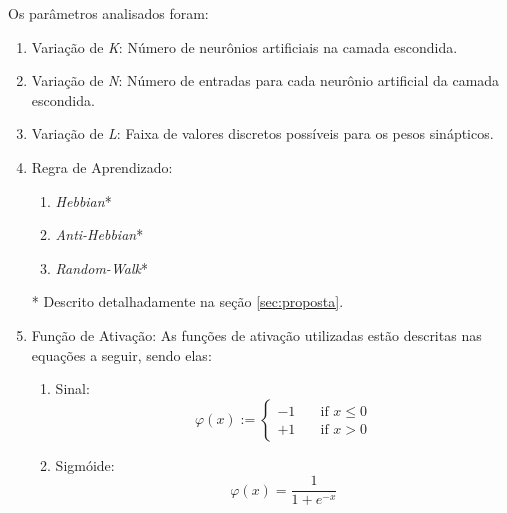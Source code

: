 \documentclass[a4paper,10pt,oneside,conference,final,keeplastbox]{inatel}
\begin{document}
            Os parâmetros analisados foram:
            \begin{enumerate}
                \item Variação de \textit{K}: Número de neurônios artificiais na camada escondida.
            
                \item Variação de \textit{N}: Número de entradas para cada neurônio artificial da camada escondida.
                
                \item Variação de \textit{L}: Faixa de valores discretos possíveis para os pesos sinápticos.
                
                \item Regra de Aprendizado:
                \begin{enumerate}
                    \item \textit{Hebbian}*
                    \item \textit{Anti-Hebbian}*
                    \item \textit{Random-Walk}*
                \end{enumerate}
                * Descrito detalhadamente na seção \ref{sec:proposta}.

                \item Função de Ativação: As funções de ativação utilizadas estão descritas nas equações a seguir, sendo elas:
                
                \begin{enumerate}
                    \item Sinal:
                        \begin{equation}
                            \label{eq:act_func_signal}
                            \textit{$\varphi(x)$} :=
                            \begin{cases}
                                -1 & \quad \text{if } x \leq 0 \\
                                +1 & \quad \text{if } x > 0
                            \end{cases}
                        \end{equation}
                    
                    \item Sigmóide:
                        \begin{equation}
                            \label{eq:act_func_sigmoid}
                            \textit{$\varphi(x)$} = \frac{1}{1 + e^{-x}}
                        \end{equation}
                    

\end{enumerate}
\end{enumerate}
\end{document}
